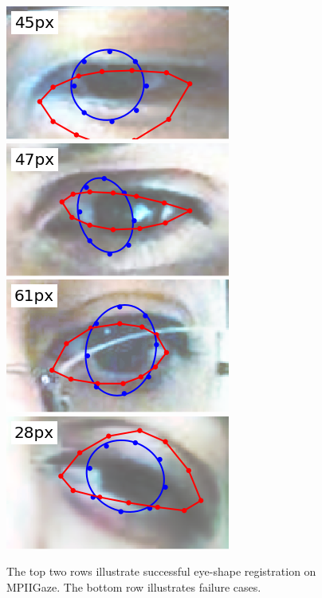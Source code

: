 \begin{figure}
    \par \vspace{0.1em}
    \includegraphics[width=0.244\columnwidth]{figs/ldmks_examples/idx_179.png}\hfill
    \includegraphics[width=0.244\columnwidth]{figs/ldmks_examples/idx_42.png}\hfill
    \includegraphics[width=0.244\columnwidth]{figs/ldmks_examples/idx_63.png}\hfill
    \includegraphics[width=0.244\columnwidth]{figs/ldmks_examples/idx_96.png}
    \caption{The top two rows illustrate successful eye-shape registration on MPIIGaze. The bottom row illustrates failure cases.}
    \label{fig:clnf_examples}
\end{figure}